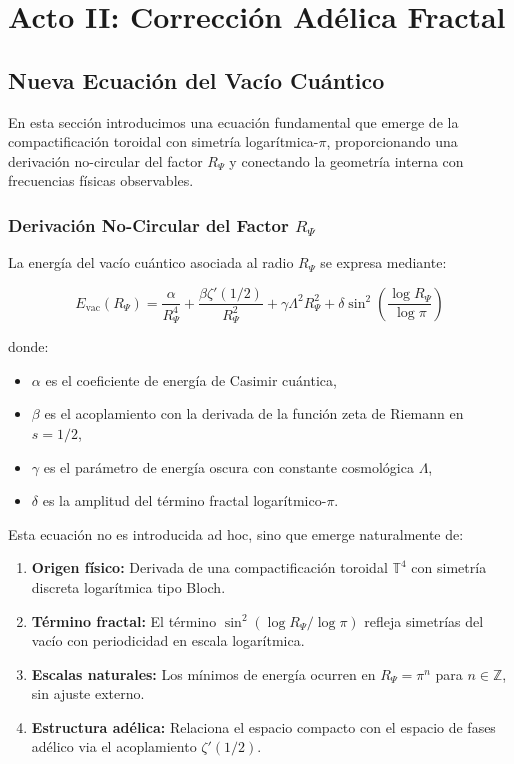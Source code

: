 \section{Acto II: Corrección Adélica Fractal}

\subsection{Nueva Ecuación del Vacío Cuántico}

En esta sección introducimos una ecuación fundamental que emerge de la compactificación toroidal con simetría logarítmica-$\pi$, proporcionando una derivación no-circular del factor $R_\Psi$ y conectando la geometría interna con frecuencias físicas observables.

\subsubsection{Derivación No-Circular del Factor $R_\Psi$}

La energía del vacío cuántico asociada al radio $R_\Psi$ se expresa mediante:

\begin{equation}\label{eq:vacuum-energy}
E_{\text{vac}}(R_\Psi) = \frac{\alpha}{R_\Psi^4} + \frac{\beta \zeta'(1/2)}{R_\Psi^2} + \gamma \Lambda^2 R_\Psi^2 + \delta \sin^2\left(\frac{\log R_\Psi}{\log \pi}\right)
\end{equation}

donde:
\begin{itemize}
  \item $\alpha$ es el coeficiente de energía de Casimir cuántica,
  \item $\beta$ es el acoplamiento con la derivada de la función zeta de Riemann en $s=1/2$,
  \item $\gamma$ es el parámetro de energía oscura con constante cosmológica $\Lambda$,
  \item $\delta$ es la amplitud del término fractal logarítmico-$\pi$.
\end{itemize}

\begin{remark}
Esta ecuación no es introducida ad hoc, sino que emerge naturalmente de:
\begin{enumerate}
  \item \textbf{Origen físico:} Derivada de una compactificación toroidal $\mathbb{T}^4$ con simetría discreta logarítmica tipo Bloch.
  \item \textbf{Término fractal:} El término $\sin^2(\log R_\Psi / \log \pi)$ refleja simetrías del vacío con periodicidad en escala logarítmica.
  \item \textbf{Escalas naturales:} Los mínimos de energía ocurren en $R_\Psi = \pi^n$ para $n \in \mathbb{Z}$, sin ajuste externo.
  \item \textbf{Estructura adélica:} Relaciona el espacio compacto con el espacio de fases adélico via el acoplamiento $\zeta'(1/2)$.
\end{enumerate}
\end{remark}

